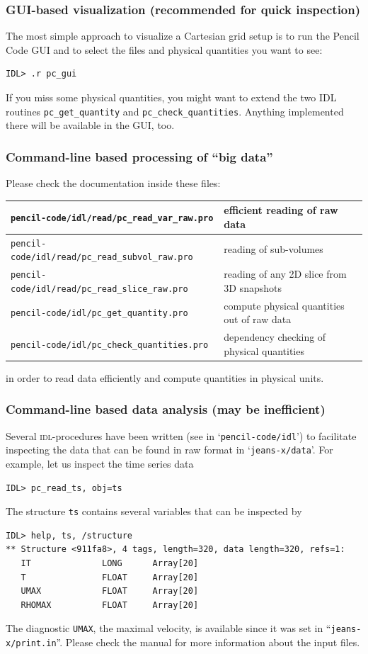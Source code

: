 \documentclass[a4paper,12pt]{article}
\newcommand{\command}[1]{\texttt{#1}}
\newcommand{\file}[1]{``\texttt{#1}''}
\newcommand{\directory}[1]{`\texttt{#1}'}
\newcommand{\name}[1]{\textsc{#1}}
\newcommand{\code}[1]{\texttt{#1}}
\begin{document}
\subsubsection{GUI-based visualization (recommended for quick inspection)}
The most simple approach to visualize a Cartesian grid setup is to run the Pencil Code GUI and to select the files and physical quantities you want to see:
\begin{verbatim}
IDL> .r pc_gui
\end{verbatim}
If you miss some physical quantities, you might want to extend the two IDL routines \command{pc\_get\_quantity} and \command{pc\_check\_quantities}. Anything implemented there will be available in the GUI, too.

\subsubsection{Command-line based processing of ``big data''}
Please check the documentation inside these files:
\begin{center}
\begin{tabular}{|l|l|}\hline
  \command{pencil-code/idl/read/pc\_read\_var\_raw.pro} & efficient reading of raw data\\\hline
  \command{pencil-code/idl/read/pc\_read\_subvol\_raw.pro} & reading of sub-volumes\\\hline
  \command{pencil-code/idl/read/pc\_read\_slice\_raw.pro} & reading of any 2D slice from 3D snapshots\\\hline
  \command{pencil-code/idl/pc\_get\_quantity.pro} & compute physical quantities out of raw data\\\hline
  \command{pencil-code/idl/pc\_check\_quantities.pro} & dependency checking of physical quantities\\\hline
\end{tabular}
\end{center}
in order to read data efficiently and compute quantities in physical units.

\subsubsection{Command-line based data analysis (may be inefficient)}
Several \name{idl}-procedures have been written
(see in \directory{pencil-code/idl}) to facilitate inspecting the data
that can be found in raw format in \directory{jeans-x/data}.
For example, let us inspect the time series data
\begin{verbatim}
IDL> pc_read_ts, obj=ts
\end{verbatim}
The structure \code{ts} contains several variables that can be inspected by
\begin{verbatim}
IDL> help, ts, /structure
** Structure <911fa8>, 4 tags, length=320, data length=320, refs=1:
   IT              LONG      Array[20]
   T               FLOAT     Array[20]
   UMAX            FLOAT     Array[20]
   RHOMAX          FLOAT     Array[20]
\end{verbatim}
The diagnostic \code{UMAX}, the maximal velocity, is available since it was set
in \file{jeans-x/print.in}. Please check the manual for more information about the input files.
\end{document}

